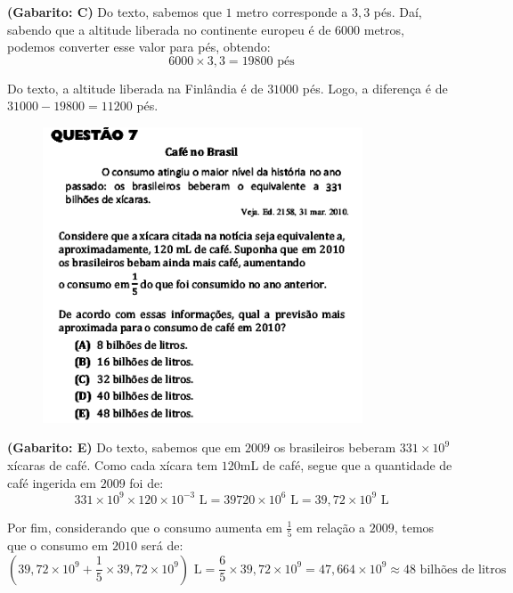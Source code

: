 \documentclass[a4paper]{article}
\begin{document}
\par\textbf{(Gabarito: C)} Do texto, sabemos que $1$ metro corresponde a $3,3$ pés. Daí, sabendo que a altitude liberada no continente europeu é de $6000$ metros, podemos converter esse valor para pés, obtendo:
\begin{equation*}
6000\times 3,3 = 19800 \text{ pés}
\end{equation*} 
\par\vspace{0.3cm} Do texto, a altitude liberada na Finlândia é de $31000$ pés. Logo, a diferença é de $31000 - 19800 = 11200$ pés.
\begin{figure}[H]
	\begin{center}
		\includegraphics[width=9.5cm]{L2Q7.png}
	\end{center}
\end{figure}
\par\textbf{(Gabarito: E)} Do texto, sabemos que em $2009$ os brasileiros beberam $331\times 10^9$ xícaras de café. Como cada xícara tem $120$mL de café, segue que a quantidade de café ingerida em $2009$ foi de:
\begin{equation*}
331\times 10^9\times 120\times 10^{-3}\text{ L} =  39720\times 10^6\text{ L} = 39,72\times 10^9\text{ L}
\end{equation*}
\par\vspace{0.3cm} Por fim, considerando que o consumo aumenta em $\displaystyle{ \frac{1}{5} }$ em relação a $2009$, temos que o consumo em $2010$ será de:
\begin{equation*}
\left(39,72\times 10^9 + \frac{1}{5}\times 39,72\times 10^9\right)\text{ L} = \frac{6}{5}\times 39,72\times 10^9 = 47,664\times 10^9\approx 48\text{ bilhões de litros}
\end{equation*}
\end{document}
